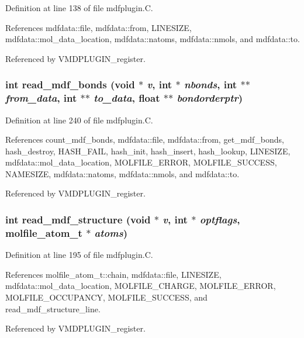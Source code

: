 Definition at line 138 of file mdfplugin.C.

References mdfdata::file, mdfdata::from, LINESIZE, mdfdata::mol\_\-data\_\-location, mdfdata::natoms, mdfdata::nmols, and mdfdata::to.

Referenced by VMDPLUGIN\_\-register.
\subsubsection{\setlength{\rightskip}{0pt plus 5cm}int read\_\-mdf\_\-bonds (void $\ast$ {\em v}, int $\ast$ {\em nbonds}, int $\ast$$\ast$ {\em from\_\-data}, int $\ast$$\ast$ {\em to\_\-data}, float $\ast$$\ast$ {\em bondorderptr})\hspace{0.3cm}{\tt  [static]}}\label{mdfplugin_8C_a9}




Definition at line 240 of file mdfplugin.C.

References count\_\-mdf\_\-bonds, mdfdata::file, mdfdata::from, get\_\-mdf\_\-bonds, hash\_\-destroy, HASH\_\-FAIL, hash\_\-init, hash\_\-insert, hash\_\-lookup, LINESIZE, mdfdata::mol\_\-data\_\-location, MOLFILE\_\-ERROR, MOLFILE\_\-SUCCESS, NAMESIZE, mdfdata::natoms, mdfdata::nmols, and mdfdata::to.

Referenced by VMDPLUGIN\_\-register.
\subsubsection{\setlength{\rightskip}{0pt plus 5cm}int read\_\-mdf\_\-structure (void $\ast$ {\em v}, int $\ast$ {\em optflags}, {\bf molfile\_\-atom\_\-t} $\ast$ {\em atoms})\hspace{0.3cm}{\tt  [static]}}\label{mdfplugin_8C_a8}




Definition at line 195 of file mdfplugin.C.

References molfile\_\-atom\_\-t::chain, mdfdata::file, LINESIZE, mdfdata::mol\_\-data\_\-location, MOLFILE\_\-CHARGE, MOLFILE\_\-ERROR, MOLFILE\_\-OCCUPANCY, MOLFILE\_\-SUCCESS, and read\_\-mdf\_\-structure\_\-line.

Referenced by VMDPLUGIN\_\-register.
